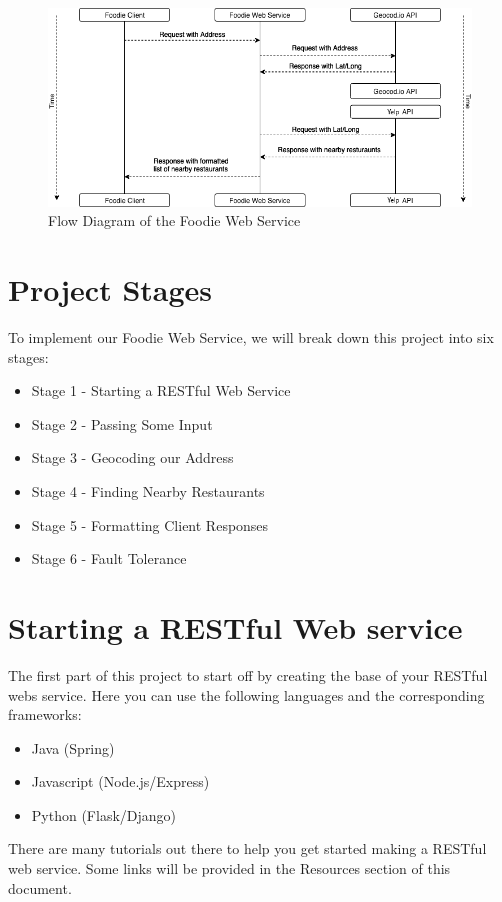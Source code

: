 \documentclass{article}
\begin{document}
\begin{figure}[h!]
    \includegraphics[width=\linewidth]{images/flowdiagram-2}
    \caption{Flow Diagram of the Foodie Web Service}
\end{figure}





\section*{Project Stages} %

To implement our Foodie Web Service, we will break down this project into six stages:
\begin{itemize}  
\item Stage 1 - Starting a RESTful Web Service
\item Stage 2 - Passing Some Input
\item Stage 3 - Geocoding our Address
\item Stage 4 - Finding Nearby Restaurants
\item Stage 5 - Formatting Client Responses
\item Stage 6 - Fault Tolerance
\end{itemize}



\section{Starting a RESTful Web service}
The first part of this project to start off by creating the base of your RESTful webs service. Here you can use the following languages and the corresponding frameworks:
\begin{itemize}
\item Java (Spring)
\item Javascript (Node.js/Express)
\item Python (Flask/Django)
\end{itemize}
There are many tutorials out there to help you get started making a RESTful web service. Some links will be provided in the Resources section of this document. 
\end{document}
